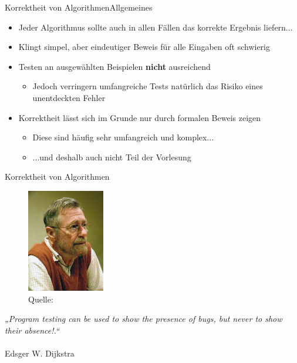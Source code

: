 
\begin{frame}{Korrektheit von Algorithmen}{Allgemeines}
    \begin{itemize}[<+->]
        \item Jeder Algorithmus sollte auch in allen Fällen das korrekte Ergebnis liefern...
        \item Klingt simpel, aber eindeutiger Beweis für alle Eingaben oft schwierig
        \item Testen an ausgewählten Beispielen \textbf{nicht} ausreichend
        \begin{itemize}
            \item Jedoch verringern umfangreiche Tests natürlich das Risiko eines unentdeckten Fehler
        \end{itemize}
        \item Korrektheit lässt sich im Grunde nur durch formalen Beweis zeigen
        \begin{itemize}
            \item Diese sind häufig sehr umfangreich und komplex...
            \item ...und deshalb auch nicht Teil der Vorlesung
        \end{itemize}
    \end{itemize}
\end{frame}

\begin{frame}{Korrektheit von Algorithmen}{}
\begin{minipage}{0.4\textwidth}
            \begin{figure}
                \includegraphics[height=4.5cm]{graph/dijkstra}
                \caption*{Quelle: }%
            \end{figure}
        \end{minipage}
        \hfill
        \begin{minipage}{0.55\textwidth}
            \textit{„Program testing can be used to show the presence of bugs, but never to show their absence!.“} \\\\Edsger W. Dijkstra
        \end{minipage}
\end{frame}

